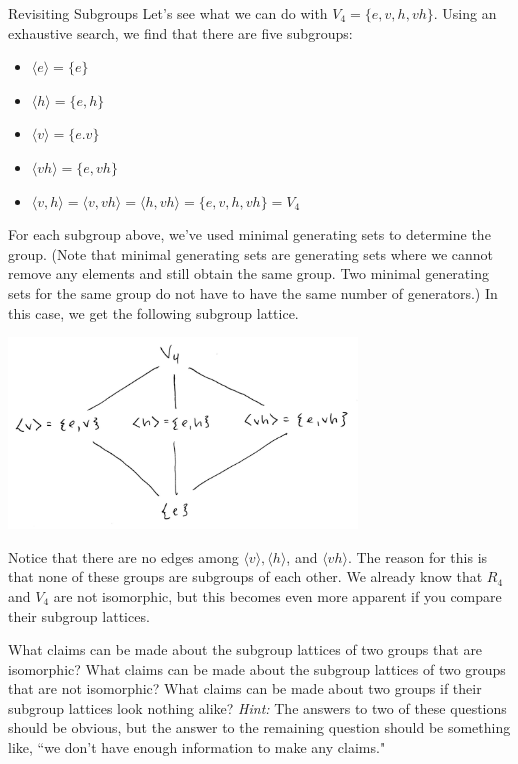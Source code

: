\begin{section}{Revisiting Subgroups}
Let's see what we can do with $V_4=\{e,v,h,vh\}$.  Using an exhaustive search, we find that there are five subgroups:
\begin{itemize}
\item[] $\langle e \rangle = \{e\}$
\item[] $\langle h \rangle  = \{e,h\}$
\item[] $\langle v \rangle  = \{e.v\}$
\item[] $\langle vh \rangle  = \{e,vh\}$
\item[] $\langle v,h \rangle = \langle v,vh\rangle = \langle h, vh\rangle= \{e,v,h,vh\}=V_4$
\end{itemize}
For each subgroup above, we've used minimal generating sets to determine the group.  (Note that minimal generating sets are generating sets where we cannot remove any elements and still obtain the same group.  Two minimal generating sets for the same group do not have to have the same number of generators.)  In this case, we get the following subgroup lattice.

\begin{center}
\includegraphics[height=2in]{latticeV4.png}
\end{center}

Notice that there are no edges among $\langle v\rangle, \langle h\rangle$, and $\langle vh\rangle$.  The reason for this is that none of these groups are subgroups of each other.  We already know that $R_4$ and $V_4$ are not isomorphic, but this becomes even more apparent if you compare their subgroup lattices.

\begin{problem}
What claims can be made about the subgroup lattices of two groups that are isomorphic? What claims can be made about the subgroup lattices of two groups that are not isomorphic?  What claims can be made about two groups if their subgroup lattices look nothing alike?  \emph{Hint:} The answers to two of these questions should be obvious, but the answer to the remaining question should be something like, ``we don't have enough information to make any claims."
\end{problem}


\end{section}
